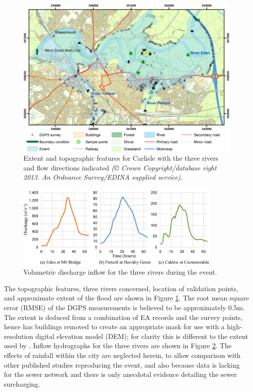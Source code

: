 \documentclass[11pt,english,a4paper]{article}
\begin{document}
\begin{figure}[tpb]
\centering
\includegraphics[width=1.0\textwidth]{Figure3.png}
\caption{Extent and topographic features for Carlisle with the three rivers and flow directions indicated \textit{(\copyright{} Crown Copyright/database right 2013. An Ordnance Survey/EDINA supplied service)}.}
\label{CarlisleMap}
\end{figure}
\begin{figure}[tpb]
\centering
\includegraphics[width=0.9\textwidth]{Figure4.png}
\caption{Volumetric discharge inflow for the three rivers during the event.}
\label{BoundaryDischarges}
\end{figure}

The topographic features, three rivers concerned, location of validation points, and approximate extent of the flood are shown in Figure \ref{CarlisleMap}. The root mean square error (RMSE) of the DGPS measurements is believed to be approximately 0.5m. The extent is deduced from a combination of EA records and the survey points, hence has buildings removed to create an appropriate mask for use with a high-resolution digital elevation model (DEM); for clarity this is different to the extent used by \citet{Horritt2010}. Inflow hydrographs for the three rivers are shown in Figure \ref{BoundaryDischarges}. The effects of rainfall within the city are neglected herein, to allow comparison with other published studies reproducing the event, and also because data is lacking for the sewer network and there is only anecdotal evidence detailing the sewer surcharging. 
\end{document}
